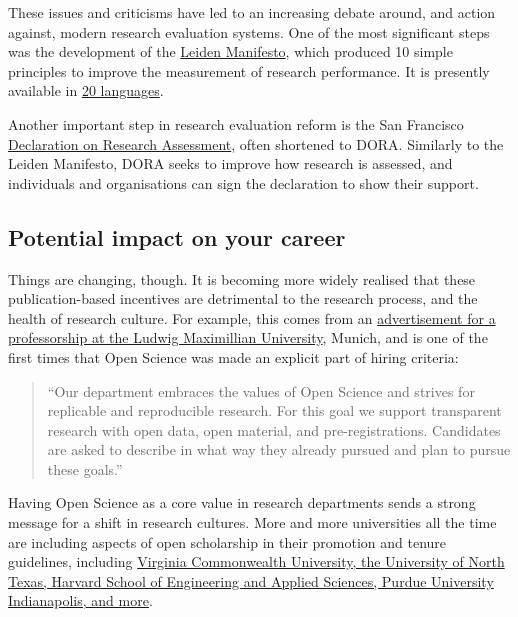 \documentclass[]{book}
\begin{document}
These issues and criticisms have led to an increasing debate around, and action against, modern research evaluation systems. One of the most significant steps was the development of the \href{http://www.leidenmanifesto.org/}{Leiden Manifesto}, which produced 10 simple principles to improve the measurement of research performance. It is presently available in \href{http://www.leidenmanifesto.org/translations.html}{20 languages}.

Another important step in research evaluation reform is the San Francisco \href{https://sfdora.org/}{Declaration on Research Assessment}, often shortened to DORA. Similarly to the Leiden Manifesto, DORA seeks to improve how research is assessed, and individuals and organisations can sign the declaration to show their support.

\hypertarget{potential-impact-on-your-career}{%
\subsection{Potential impact on your career }\label{potential-impact-on-your-career}}

Things are changing, though. It is becoming more widely realised that these publication-based incentives are detrimental to the research process, and the health of research culture. For example, this comes from an \href{http://www.nicebread.de/open-science-hiring-practices/}{advertisement for a professorship at the Ludwig Maximillian University}, Munich, and is one of the first times that Open Science was made an explicit part of hiring criteria:

\begin{quote}
``Our department embraces the values of Open Science and strives for replicable and reproducible research. For this goal we support transparent research with open data, open material, and pre-registrations. Candidates are asked to describe in what way they already pursued and plan to pursue these goals.''
\end{quote}

Having Open Science as a core value in research departments sends a strong message for a shift in research cultures. More and more universities all the time are including aspects of open scholarship in their promotion and tenure guidelines, including \href{http://whyopenresearch.org/promotion}{Virginia Commonwealth University, the University of North Texas, Harvard School of Engineering and Applied Sciences, Purdue University Indianapolis, and more}.
\end{document}
